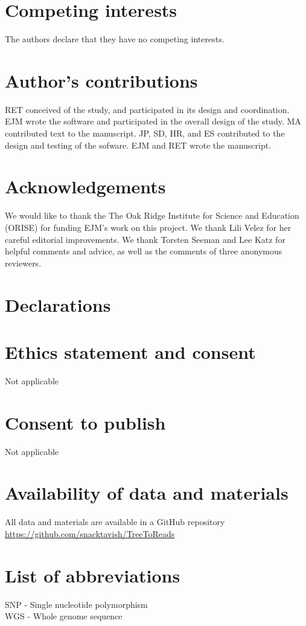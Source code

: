 \documentclass{bmcart}
\begin{document}
\begin{backmatter}

\section*{Competing interests}
  The authors declare that they have no competing interests.

\section*{Author's contributions}
    RET conceived of the study, and participated in its design and coordination.
    EJM wrote the software and participated in the overall design of the study.
    MA contributed text to the manuscript.
    JP, SD, HR, and ES contributed to the design and testing of the sofware.
    EJM and RET wrote the manuscript.
    
\section*{Acknowledgements}
  We would like to thank the The Oak Ridge Institute for Science and Education (ORISE) for funding EJM's work on this project.
  We thank Lili Velez for her careful editorial improvements. 
  We thank Torsten Seeman and Lee Katz for helpful comments and advice, as well as the comments of three anonymous reviewers.
  
\section*{Declarations}
\section*{Ethics statement and consent}
Not applicable

\section*{Consent to publish}
Not applicable

\section*{Availability of data and materials}
All data and materials are available in a GitHub repository
\url{https://github.com/snacktavish/TreeToReads}

\section*{List of abbreviations}
SNP - Single nucleotide polymorphism\\
WGS - Whole genome sequence



\end{backmatter}
\end{document}
